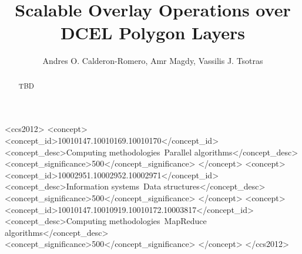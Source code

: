 \documentclass[sigconf]{acmart}
\begin{document}
\title{Scalable Overlay Operations over DCEL Polygon Layers}

\author{Andres O. Calderon-Romero, Amr Magdy, Vassilis J. Tsotras}


\renewcommand{\shortauthors}{Calderon, et al.}

\begin{abstract}
    TBD
\end{abstract}

\begin{CCSXML}
<ccs2012>
   <concept>
       <concept_id>10010147.10010169.10010170</concept_id>
       <concept_desc>Computing methodologies~Parallel algorithms</concept_desc>
       <concept_significance>500</concept_significance>
       </concept>
   <concept>
       <concept_id>10002951.10002952.10002971</concept_id>
       <concept_desc>Information systems~Data structures</concept_desc>
       <concept_significance>500</concept_significance>
       </concept>
   <concept>
       <concept_id>10010147.10010919.10010172.10003817</concept_id>
       <concept_desc>Computing methodologies~MapReduce algorithms</concept_desc>
       <concept_significance>500</concept_significance>
       </concept>
 </ccs2012>
\end{CCSXML}
\end{document}
